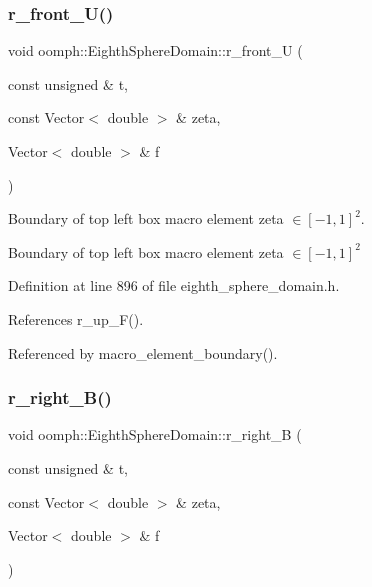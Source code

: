 \subsubsection{\texorpdfstring{r\+\_\+front\+\_\+\+U()}{r\_front\_U()}}
{\footnotesize\ttfamily void oomph\+::\+Eighth\+Sphere\+Domain\+::r\+\_\+front\+\_\+U (\begin{DoxyParamCaption}\item[{const unsigned \&}]{t,  }\item[{const Vector$<$ double $>$ \&}]{zeta,  }\item[{Vector$<$ double $>$ \&}]{f }\end{DoxyParamCaption})\hspace{0.3cm}{\ttfamily [private]}}



Boundary of top left box macro element zeta $ \in [-1,1]^2 $. 

Boundary of top left box macro element zeta $ \in [-1,1]^2 $ 

Definition at line 896 of file eighth\+\_\+sphere\+\_\+domain.\+h.



References r\+\_\+up\+\_\+\+F().



Referenced by macro\+\_\+element\+\_\+boundary().

\mbox{\label{classoomph_1_1EighthSphereDomain_ac013c364bfe2f0bb1d3393696149d249}} 
\subsubsection{\texorpdfstring{r\+\_\+right\+\_\+\+B()}{r\_right\_B()}}
{\footnotesize\ttfamily void oomph\+::\+Eighth\+Sphere\+Domain\+::r\+\_\+right\+\_\+B (\begin{DoxyParamCaption}\item[{const unsigned \&}]{t,  }\item[{const Vector$<$ double $>$ \&}]{zeta,  }\item[{Vector$<$ double $>$ \&}]{f }\end{DoxyParamCaption})\hspace{0.3cm}{\ttfamily [private]}}



